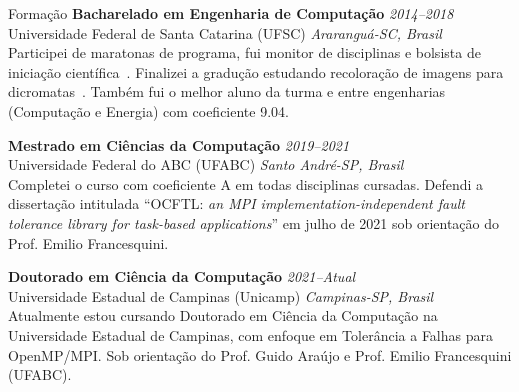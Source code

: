 \documentclass[a4paper]{resume}
\begin{document}
 


\begin{rSection}{Formação}
{\bf Bacharelado em Engenharia de Computação} \hfill {\em 2014--2018} \\
{\sc Universidade Federal de Santa Catarina (UFSC)} \hfill {\em Araranguá-SC, Brasil} \\
Participei de maratonas de programa, fui monitor de disciplinas e bolsista de iniciação 
científica~\cite{pibic}. Finalizei a gradução estudando recoloração de imagens para dicromatas~\cite{tcc}. 
Também fui o melhor aluno da turma e entre engenharias (Computação e Energia) com coeficiente 9.04.

{\bf Mestrado em Ciências da Computação} \hfill {\em 2019--2021} \\
{\sc Universidade Federal do ABC (UFABC)} \hfill {\em Santo André-SP, Brasil} \\
Completei o curso com coeficiente A em todas disciplinas cursadas. Defendi a
dissertação intitulada ``OCFTL: {\it an MPI implementation-independent
fault tolerance library for task-based
applications}'' em julho de 2021 sob orientação do Prof. Emilio Francesquini.

{\bf Doutorado em Ciência da Computação} \hfill {\em 2021--Atual} \\
{\sc Universidade Estadual de Campinas (Unicamp)} \hfill {\em Campinas-SP, Brasil} \\
Atualmente estou cursando Doutorado em Ciência da Computação na Universidade
Estadual de Campinas, com enfoque em Tolerância a Falhas para OpenMP/MPI. 
Sob orientação do Prof. Guido Araújo e Prof. Emilio Francesquini (UFABC).
\end{rSection}

\end{document}
